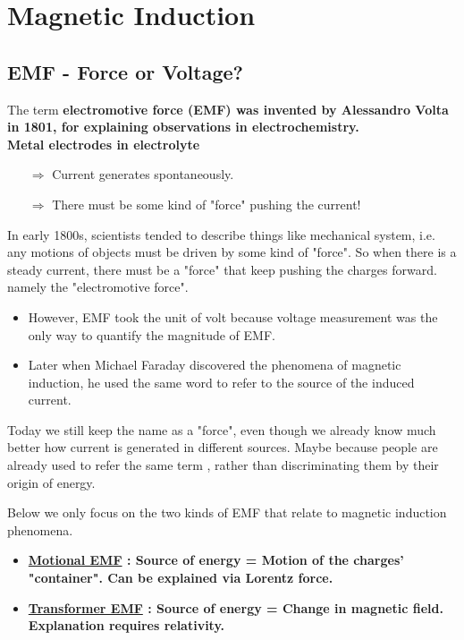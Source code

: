\documentclass[class=article, crop=false, 12pt]{standalone}
\begin{document}
\linesep
\section{Magnetic Induction}


\subsection{EMF - Force or Voltage?}

The term \bf{electromotive force} (EMF) was invented by Alessandro Volta in 1801,
for explaining observations in electrochemistry.\\

Metal electrodes in electrolyte 
\begin{itemize}
    \item[$\Rightarrow$] Current generates spontaneously.
    \item[$\Rightarrow$] There must be some kind of "force" pushing the current! 
\end{itemize}


In early 1800s, scientists tended to describe things like mechanical system,
i.e. any motions of objects must be driven by some kind of "force".
So when there is a steady current, 
there must be a "force" that keep pushing the charges forward.
namely the "electromotive force". 

\begin{itemize}
    \item However, EMF took the unit of volt because 
    voltage measurement was the only way to quantify the magnitude of EMF.
    \item Later when Michael Faraday discovered the phenomena of magnetic induction,
    he used the same word to refer to the source of the induced current.
\end{itemize}


Today we still keep the name as a "force", 
even though we already know much better how current is generated in different sources.
Maybe because people are already used to refer the same term , 
rather than discriminating them by their origin of energy.


Below we only focus on the two kinds of EMF that relate to magnetic induction phenomena.
\begin{itemize}
    \item \bf{\ul{Motional EMF}} : Source of energy = Motion of the charges' "container".
    Can be explained via Lorentz force.

    \item \bf{\ul{Transformer EMF}} : Source of energy = Change in magnetic field.
    Explanation requires relativity.
\end{itemize}
\end{document}

